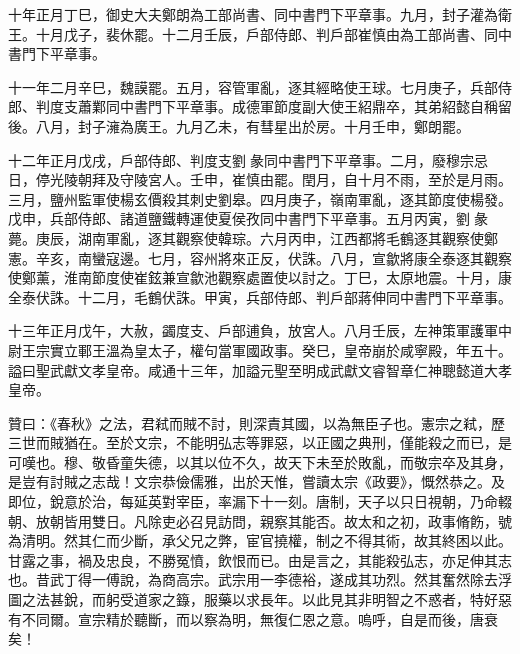 \begin{pinyinscope}
 十年正月丁巳，御史大夫鄭朗為工部尚書、同中書門下平章事。九月，封子灌為衛王。十月戊子，裴休罷。十二月壬辰，戶部侍郎、判戶部崔慎由為工部尚書、同中書門下平章事。



 十一年二月辛巳，魏謨罷。五月，容管軍亂，逐其經略使王球。七月庚子，兵部侍郎、判度支蕭鄴同中書門下平章事。成德軍節度副大使王紹鼎卒，其弟紹懿自稱留後。八月，封子澭為廣王。九月乙未，有彗星出於房。十月壬申，鄭朗罷。



 十二年正月戊戌，戶部侍郎、判度支劉彖同中書門下平章事。二月，廢穆宗忌日，停光陵朝拜及守陵宮人。壬申，崔慎由罷。閏月，自十月不雨，至於是月雨。三月，鹽州監軍使楊玄價殺其刺史劉皋。四月庚子，嶺南軍亂，逐其節度使楊發。戊申，兵部侍郎、諸道鹽鐵轉運使夏侯孜同中書門下平章事。五月丙寅，劉彖薨。庚辰，湖南軍亂，逐其觀察使韓琮。六月丙申，江西都將毛鶴逐其觀察使鄭憲。辛亥，南蠻寇邊。七月，容州將來正反，伏誅。八月，宣歙將康全泰逐其觀察使鄭薰，淮南節度使崔鉉兼宣歙池觀察處置使以討之。丁巳，太原地震。十月，康全泰伏誅。十二月，毛鶴伏誅。甲寅，兵部侍郎、判戶部蔣伸同中書門下平章事。



 十三年正月戊午，大赦，蠲度支、戶部逋負，放宮人。八月壬辰，左神策軍護軍中尉王宗實立鄆王溫為皇太子，權句當軍國政事。癸巳，皇帝崩於咸寧殿，年五十。謚曰聖武獻文孝皇帝。咸通十三年，加謚元聖至明成武獻文睿智章仁神聰懿道大孝皇帝。



 贊曰：《春秋》之法，君弒而賊不討，則深責其國，以為無臣子也。憲宗之弒，歷三世而賊猶在。至於文宗，不能明弘志等罪惡，以正國之典刑，僅能殺之而已，是可嘆也。穆、敬昏童失德，以其以位不久，故天下未至於敗亂，而敬宗卒及其身，是豈有討賊之志哉！文宗恭儉儒雅，出於天惟，嘗讀太宗《政要》，慨然恭之。及即位，銳意於治，每延英對宰臣，率漏下十一刻。唐制，天子以只日視朝，乃命輟朝、放朝皆用雙日。凡除吏必召見訪問，親察其能否。故太和之初，政事脩飭，號為清明。然其仁而少斷，承父兄之弊，宦官撓權，制之不得其術，故其終困以此。甘露之事，禍及忠良，不勝冤憤，飲恨而已。由是言之，其能殺弘志，亦足伸其志也。昔武丁得一傅說，為商高宗。武宗用一李德裕，遂成其功烈。然其奮然除去浮圖之法甚銳，而躬受道家之籙，服藥以求長年。以此見其非明智之不惑者，特好惡有不同爾。宣宗精於聽斷，而以察為明，無復仁恩之意。嗚呼，自是而後，唐衰矣！



\end{pinyinscope}